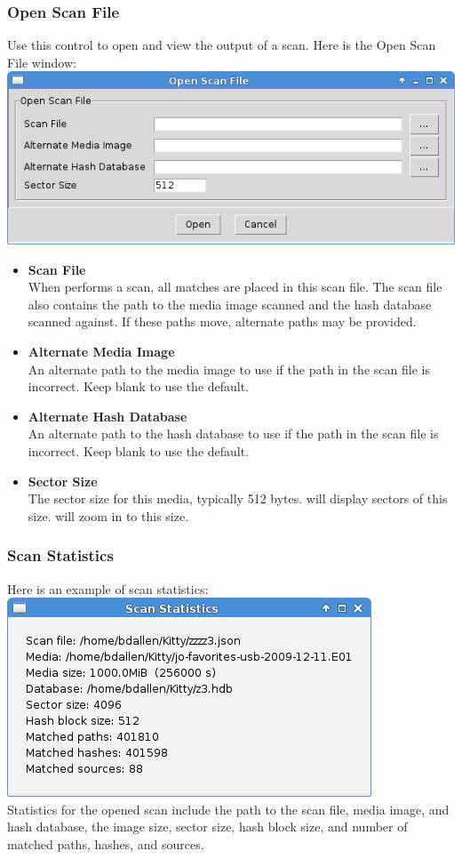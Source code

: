 \documentclass[11pt,fleqn]{article} %
\begin{document}
\subsubsection{Open Scan File}
Use this control to open and view the output of a \hdb scan. Here is the Open Scan File window:\\
\includegraphics[scale=.4]{screenshots/open_scan_file}\\
\begin{itemize}
\item \textbf{Scan File}\\
When \hdb performs a scan, all matches are placed in this scan file. The scan file also contains the path to the media image scanned and the hash database scanned against. If these paths move, alternate paths may be provided.
\item \textbf{Alternate Media Image}\\
An alternate path to the media image to use if the path in the scan file is incorrect. Keep blank to use the default.
\item \textbf{Alternate Hash Database}\\
An alternate path to the hash database to use if the path in the scan file is incorrect. Keep blank to use the default.
\item \textbf{Sector Size}\\
The sector size for this media, typically 512 bytes. \sscope will display sectors of this size. \sscope will zoom in to this size.
\end{itemize}

\subsubsection{Scan Statistics}
Here is an example of scan statistics:\\
\includegraphics[scale=.4]{screenshots/scan_statistics}\\
Statistics for the opened scan include the path to the scan file, media image, and hash database, the image size, sector size, hash block size, and number of matched paths, hashes, and sources.
\end{document}
